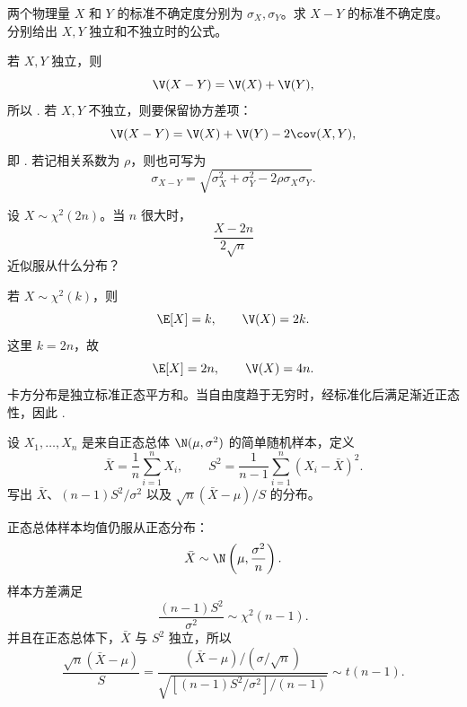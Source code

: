 \begin{question}[误差传播]
两个物理量 $X$ 和 $Y$ 的标准不确定度分别为 $\sigma_X,\sigma_Y$。求 $X-Y$ 的标准不确定度。分别给出 $X,Y$ 独立和不独立时的公式。
\begin{solution}
若 $X,Y$ 独立，则
\[
\V(X-Y)=\V(X)+\V(Y),
\]
所以
.
若 $X,Y$ 不独立，则要保留协方差项：
\[
\V(X-Y)=\V(X)+\V(Y)-2\cov(X,Y),
\]
即
.
若记相关系数为 $\rho$，则也可写为
\[
\sigma_{X-Y}=\sqrt{\sigma_X^2+\sigma_Y^2-2\rho\sigma_X\sigma_Y}.
\]
\end{solution}
\end{question}

\begin{question}[卡方分布的渐近正态]
设 $X\sim\chi^2(2n)$。当 $n$ 很大时，
\[
\frac{X-2n}{2\sqrt n}
\]
近似服从什么分布？
\begin{solution}
若 $X\sim\chi^2(k)$，则
\[
\E[X]=k,\qquad \V(X)=2k.
\]
这里 $k=2n$，故
\[
\E[X]=2n,\qquad \V(X)=4n.
\]
卡方分布是独立标准正态平方和。当自由度趋于无穷时，经标准化后满足渐近正态性，因此
.
\end{solution}
\end{question}

\begin{question}[正态总体的常用抽样分布]
设 $X_1,\ldots,X_n$ 是来自正态总体 $\N(\mu,\sigma^2)$ 的简单随机样本，定义
\[
\bar X=\frac1n\sum_{i=1}^nX_i,\qquad
S^2=\frac1{n-1}\sum_{i=1}^n(X_i-\bar X)^2.
\]
写出 $\bar X$、$(n-1)S^2/\sigma^2$ 以及 $\sqrt n(\bar X-\mu)/S$ 的分布。
\begin{solution}
正态总体样本均值仍服从正态分布：
\[
\bar X\sim \N\left(\mu,\frac{\sigma^2}{n}\right).
\]
样本方差满足
\[
\frac{(n-1)S^2}{\sigma^2}\sim\chi^2(n-1).
\]
并且在正态总体下，$\bar X$ 与 $S^2$ 独立，所以
\[
\frac{\sqrt n(\bar X-\mu)}{S}
=\frac{(\bar X-\mu)/(\sigma/\sqrt n)}{\sqrt{[(n-1)S^2/\sigma^2]/(n-1)}}
\sim t(n-1).
\]
\end{solution}
\end{question}

